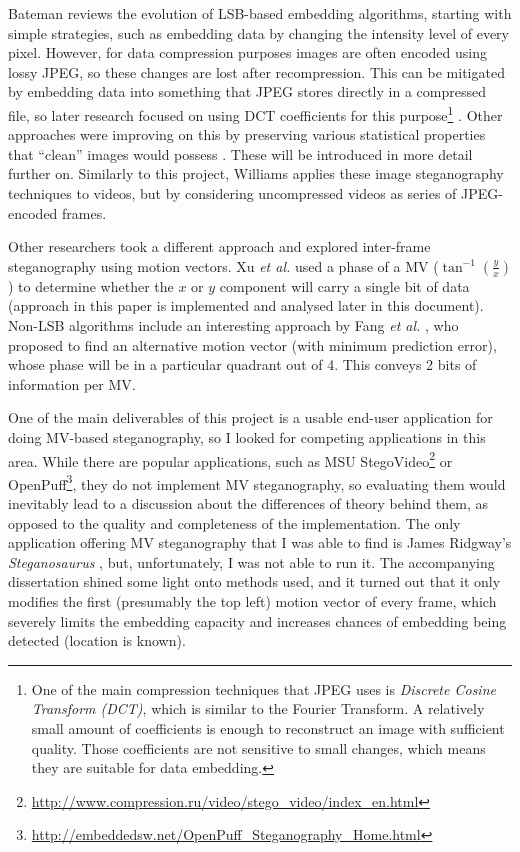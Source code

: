 \documentclass[12pt,british,twoside,notitlepage,usenames,dvipsnames,hypens,final]{report}
\numberwithin{equation}{section}
\numberwithin{figure}{section}
\begin{document}
Bateman \cite{bateman} reviews the evolution of LSB-based embedding algorithms, starting with simple strategies, such as embedding data by changing the intensity level of every pixel. However, for data compression purposes images are often encoded using lossy JPEG, so these changes are lost after recompression. This can be mitigated by embedding data into something that JPEG stores directly in a compressed file, so later research focused on using DCT coefficients for this purpose\footnote{
One of the main compression techniques that JPEG uses is \emph{Discrete Cosine Transform (DCT)}, which is similar to the Fourier Transform. A relatively small amount of coefficients is enough to reconstruct an image with sufficient quality. Those coefficients are not sensitive to small changes, which means they are suitable for data embedding.} \cite{jpegdctcoding}. Other approaches were improving on this by preserving various statistical properties that ``clean'' images would possess \cite{bateman, f5}. These will be introduced in more detail further on. Similarly to this project, Williams \cite{scott-fs} applies these image steganography techniques to videos, but by considering uncompressed videos as series of JPEG-encoded frames.

Other researchers took a different approach and explored inter-frame steganography using motion vectors. Xu \emph{et al.} \cite{xu2006steganography} used a phase of a MV ($\tan^{-1}(\frac{y}{x})$) to determine whether the $x$ or $y$ component will carry a single bit of data (approach in this paper is implemented and analysed later in this document). Non-LSB algorithms include an interesting approach by Fang \emph{et al.} \cite{fang2006data}, who proposed to find an alternative motion vector (with minimum prediction error), whose phase will be in a particular quadrant out of 4. This conveys 2 bits of information per MV.

One of the main deliverables of this project is a usable end-user application for doing MV-based steganography, so I looked for competing applications in this area. While there are popular applications, such as MSU StegoVideo\footnote{\url{http://www.compression.ru/video/stego_video/index_en.html}} or OpenPuff\footnote{\url{http://embeddedsw.net/OpenPuff_Steganography_Home.html}}, they do not implement MV steganography, so evaluating them would inevitably lead to a discussion about the differences of theory behind them, as opposed to the quality and completeness of the implementation. The only application offering MV steganography that I was able to find is James Ridgway's \emph{Steganosaurus} \cite{steganosaurus}, but, unfortunately, I was not able to run it. The accompanying dissertation shined some light onto methods used, and it turned out that it only modifies the first (presumably the top left) motion vector of every frame, which severely limits the embedding capacity and increases chances of embedding being detected (location is known).   
\end{document}
